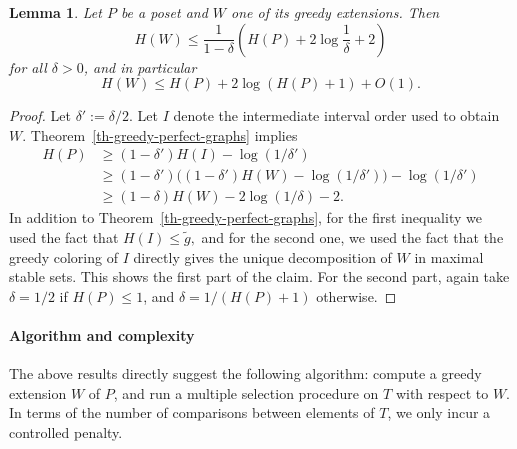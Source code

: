\documentclass[12pt,oneside]{article}
\newtheorem{lemma}{Lemma}
\begin{document}
\begin{lemma}
\label{lem-greedy}
Let $P$ be a poset and $W$ one of its greedy extensions.
Then
$$
H(W) \le \frac{1}{1-\delta} \left(H(P) + 2\log \frac{1}{\delta} + 2\right)
$$
for all $\delta > 0$, and in particular
$$
H(W) \le H(P) + 2\log (H(P)+1) + O(1).
$$
\end{lemma}
\begin{proof}
Let $\delta' := \delta/2$. Let $I$ denote the intermediate interval order used to obtain $W$. Theorem~\ref{th-greedy-perfect-graphs} implies
\begin{align*}
H(P) &\geq (1-\delta')H(I) - \log(1/\delta') \\
&\geq(1-\delta')\big( (1-\delta')H(W) - \log(1/\delta') \big) - \log(1/\delta') \\
&\geq (1-\delta) H(W) - 2 \log(1/\delta) - 2.
\end{align*}
In addition to Theorem~\ref{th-greedy-perfect-graphs}, for the first inequality we used the fact that $H(I)\leq \tilde g,$ and for the second one, we used the fact that the greedy coloring of $I$ directly gives the unique decomposition of $W$ in maximal stable sets.
This shows the first part of the claim. For the second part, again take $\delta = 1/2$ if $H(P)\leq 1$, and $\delta =1/(H(P)+1)$ otherwise.
\end{proof}

\paragraph{Algorithm {and complexity}}
The above results directly suggest the following algorithm:
compute a greedy extension $W$ of $P$, and
run a multiple selection procedure on $T$ with respect to $W$. In terms of the number of comparisons
between elements of $T$, we only incur a controlled penalty.
\end{document}
